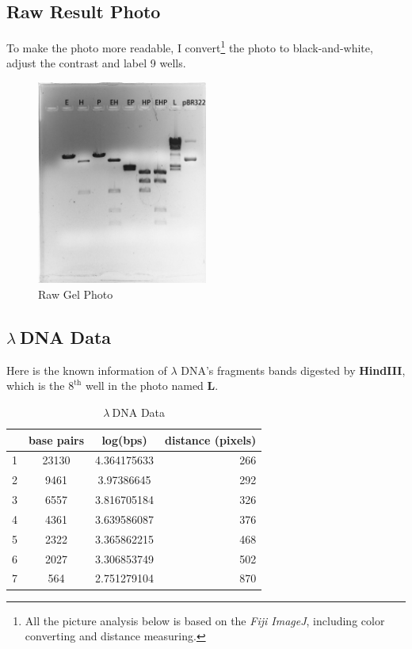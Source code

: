 \documentclass{article}
\begin{document}
        \subsection{Raw Result Photo}
            To make the photo more readable, I convert\footnote{All the picture analysis below is based on the \textit{Fiji ImageJ}, including color converting and distance measuring.}
            the photo to black-and-white, adjust the contrast and label 9 wells.
            \begin{figure}[H]
                \centering
                \includegraphics[width = 0.5\textwidth]{../Data/xun_and_sam.png}
                \caption{Raw Gel Photo}
            \end{figure}

        \subsection{\boldmath$\lambda\ $\unboldmath DNA Data}
            Here is the known information of $\lambda$ DNA's fragments bands digested by \textbf{HindIII}, which is the $8^{\text{th}}$ well in the photo named {\bf{L}}.

            \begin{table}[H]
                \caption{$\lambda\ $DNA Data}
                \centering
                \begin{tabular}{|l|c|c|r|}
                    \hline
                    &base pairs&log(bps)&distance (pixels)\\
                    \hline
                    1&      23130&4.364175633&266\\
                    2&      9461&3.97386645&292\\
                    3&      6557&3.816705184&326\\
                    4&      4361&3.639586087&376\\
                    5&      2322&3.365862215&468\\
                    6&      2027&3.306853749&502\\
                    7&      564&2.751279104&870\\
                    \hline
                \end{tabular}
                \label{l.data}
            \end{table}
\end{document}
